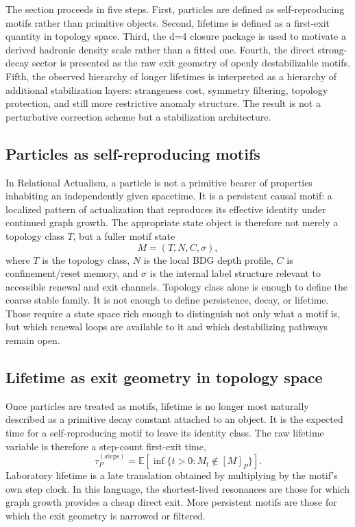 \documentclass[11pt]{article}
\begin{document}
The section proceeds in five steps. First, particles are defined as self-reproducing motifs rather than primitive objects. Second, lifetime is defined as a first-exit quantity in topology space. Third, the d=4 closure package is used to motivate a derived hadronic density scale rather than a fitted one. Fourth, the direct strong-decay sector is presented as the raw exit geometry of openly destabilizable motifs. Fifth, the observed hierarchy of longer lifetimes is interpreted as a hierarchy of additional stabilization layers: strangeness cost, symmetry filtering, topology protection, and still more restrictive anomaly structure. The result is not a perturbative correction scheme but a stabilization architecture.

\subsection{Particles as self-reproducing motifs}
In Relational Actualism, a particle is not a primitive bearer of properties inhabiting an independently given spacetime. It is a persistent causal motif: a localized pattern of actualization that reproduces its effective identity under continued graph growth. The appropriate state object is therefore not merely a topology class $T$, but a fuller motif state
\[
M=(T,N,C,\sigma),
\]
where $T$ is the topology class, $N$ is the local BDG depth profile, $C$ is confinement/reset memory, and $\sigma$ is the internal label structure relevant to accessible renewal and exit channels. Topology class alone is enough to define the coarse stable family. It is not enough to define persistence, decay, or lifetime. Those require a state space rich enough to distinguish not only what a motif is, but which renewal loops are available to it and which destabilizing pathways remain open.

\subsection{Lifetime as exit geometry in topology space}
Once particles are treated as motifs, lifetime is no longer most naturally described as a primitive decay constant attached to an object. It is the expected time for a self-reproducing motif to leave its identity class. The raw lifetime variable is therefore a step-count first-exit time,
\[
\tau_P^{(\mathrm{steps})}
=
\mathbb E\!\left[\inf\{t>0:M_t\notin [M]_P\}\right].
\]
Laboratory lifetime is a late translation obtained by multiplying by the motif's own step clock. In this language, the shortest-lived resonances are those for which graph growth provides a cheap direct exit. More persistent motifs are those for which the exit geometry is narrowed or filtered.
\end{document}
